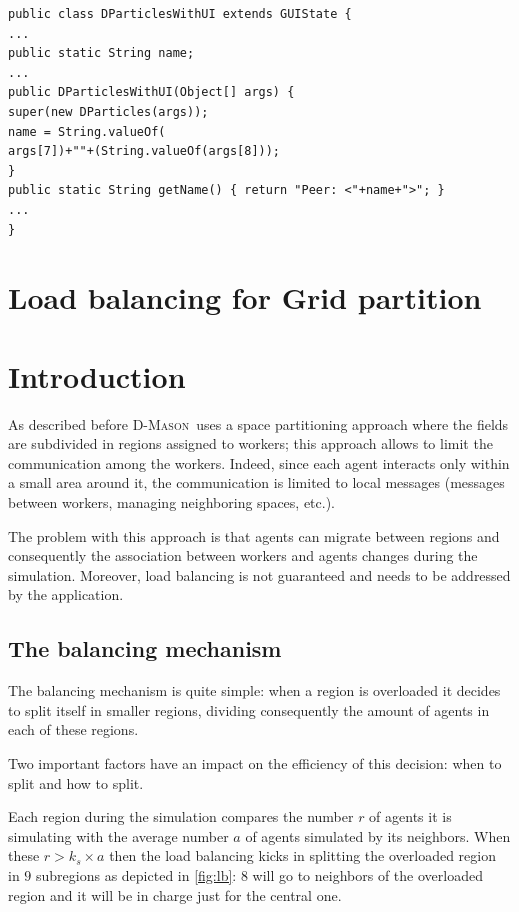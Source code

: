 \documentclass{article}
\def\dm{\textsc{D-Mason}}
\begin{document}
\begin{lstlisting}
public class DParticlesWithUI extends GUIState {
...
public static String name;
...
public DParticlesWithUI(Object[] args) {
super(new DParticles(args));
name = String.valueOf(
args[7])+""+(String.valueOf(args[8]));
}
public static String getName() { return "Peer: <"+name+">"; }
...
}
\end{lstlisting}

\section{Load balancing for Grid partition}

\section{Introduction}
As described before \dm\ uses a space partitioning approach where the fields are subdivided in regions assigned to workers; this approach allows to limit the communication among the workers. Indeed, since each agent interacts only within a small area around it, the communication is limited to local messages (messages between workers, managing neighboring spaces, etc.). 

The problem with this approach is that agents can migrate between regions and consequently the association between workers and agents changes during the simulation. Moreover, load balancing is not guaranteed and needs to be addressed by the application.

\subsection{The balancing mechanism}
The balancing mechanism is quite simple: when a region is overloaded it decides to split itself in smaller regions, dividing consequently the amount of agents in each of these regions. 

Two important factors have an impact on the efficiency of this decision: when to split and how to split.

Each region during the simulation compares the number $r$ of agents it is simulating with the average number $a$ of agents simulated by its neighbors. When these $r > k_s \times a$ then the load balancing kicks in splitting the overloaded region in $9$ subregions as depicted in \ref{fig:lb}: $8$ will go to neighbors of the overloaded region and it will be in charge just for the central one. 
\end{document}
